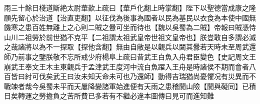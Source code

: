 雨三十餘日棧道斷絶太尉華歆上疏曰【華戶化翻上時掌翻】陛下以聖德當成康之隆願先留心於治道【治直吏翻】以征伐為後事為國者以民為基民以衣食為本使中國無饑寒之患百姓無離上之心則二賊之釁可坐而待也【魏以吳蜀為二賊】帝報曰賊憑恃山川二祖勞於前世猶不克平【二祖謂太祖武皇帝世祖文皇帝也】朕豈敢自多謂必滅之哉諸將以為不一探取【探他含翻】無由自敝是以觀兵以闚其釁若天時未至周武還師乃前事之鑒朕敬不忘所戒少府楊阜上疏曰昔武王白魚入舟君臣變色【史記周文王崩武王奉文王木主東觀兵于孟津武王度河中流白魚躍入王舟是時諸侯不期而會者八百皆曰紂可伐矣武王曰汝未知天命未可也乃還師】動得吉瑞猶尚憂懼况有災異而不戰竦者哉今吳蜀未平而天屢降變諸軍始進便有天雨之患稽閡山險【閡與礙同】已積日矣轉運之勞擔負之苦所費已多若有不繼必違本圖傳曰見可而進知難